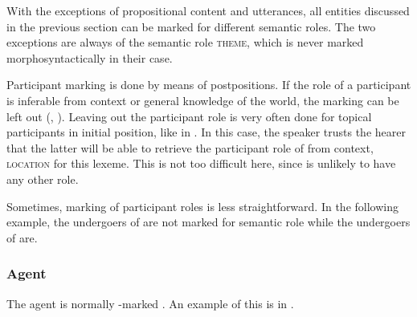 With the exceptions of propositional content and utterances, all entities discussed in the previous section can be marked for different semantic roles. The two exceptions are always of the semantic role \textsc{theme}, which is never marked morphosyntactically in their case.

Participant marking is done by means of postpositions.  If the role of a participant is inferable from context or general knowledge of the world, the marking can be left out (\citet[26]{Ansaldo2005ms}, \citet[31]{Ansaldo2008genesis}).
Leaving out the participant role is very often done for topical participants in initial position, like  in . In this case, the speaker trusts the hearer that the latter will be able to retrieve the participant role of  from context, \textsc{location} for this lexeme. This is not too difficult here, since  is unlikely to have any other role.


Sometimes, marking of participant roles is less straightforward. In the following example, the undergoers of  are not marked for semantic role while the undergoers of  are.



\subsubsection{Agent}\label{sec:func:Agent}
The agent is normally \zero-marked \citep[19]{Ansaldo2005ms}. An example of this is  in .


